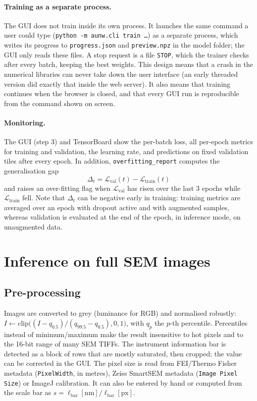 \documentclass[11pt,a4paper]{article}
\newcommand{\code}[1]{\texttt{#1}}
\begin{document}
\paragraph{Training as a separate process.} The GUI does not train inside its own process. It launches the same command a user could type (\code{python -m aunw.cli train \dots}) as a separate process, which writes its progress to \code{progress.json} and \code{preview.npz} in the model folder; the GUI only reads these files. A stop request is a file \code{STOP}, which the trainer checks after every batch, keeping the best weights. This design means that a crash in the numerical libraries can never take down the user interface (an early threaded version did exactly that inside the web server). It also means that training continues when the browser is closed, and that every GUI run is reproducible from the command shown on screen.

\paragraph{Monitoring.} The GUI (step 3) and TensorBoard show the per-batch loss, all per-epoch metrics for training and validation, the learning rate, and predictions on fixed validation tiles after every epoch. In addition, \code{overfitting\_report} computes the generalisation gap
\begin{equation}
\Delta_t=\mathcal L_{\text{val}}(t)-\mathcal L_{\text{train}}(t)
\end{equation}
and raises an over-fitting flag when $\mathcal L_{\text{val}}$ has risen over the last 3 epochs while $\mathcal L_{\text{train}}$ fell. Note that $\Delta_t$ can be negative early in training: training metrics are averaged over an epoch with dropout active and with augmented samples, whereas validation is evaluated at the end of the epoch, in inference mode, on unaugmented data.

\section{Inference on full SEM images}\label{sec:inference}
\subsection{Pre-processing}\label{sec:io}
Images are converted to grey (luminance for RGB) and normalised robustly:
$I\leftarrow\mathrm{clip}\bigl((I-q_{0.5})/(q_{99.5}-q_{0.5}),0,1\bigr)$, with $q_p$ the $p$-th percentile. Percentiles instead of minimum/maximum make the result insensitive to hot pixels and to the 16-bit range of many SEM TIFFs. The instrument information bar is detected as a block of rows that are mostly saturated, then cropped; the value can be corrected in the GUI. The pixel size is read from FEI/Thermo Fisher metadata (\code{PixelWidth}, in metres), Zeiss SmartSEM metadata (\code{Image Pixel Size}) or ImageJ calibration. It can also be entered by hand or computed from the scale bar as $s=\ell_{\text{bar}}[\mathrm{nm}]/\ell_{\text{bar}}[\mathrm{px}]$.
\end{document}
